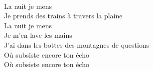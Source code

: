 \\
La nuit je mens \\
Je prends des trains à travers la plaine \\
La nuit je mens \\
Je m'en lave les mains \\
J'ai dans les bottes des montagnes de questions \\
Où subsiste encore ton écho \\
Où subsiste encore ton écho \\

